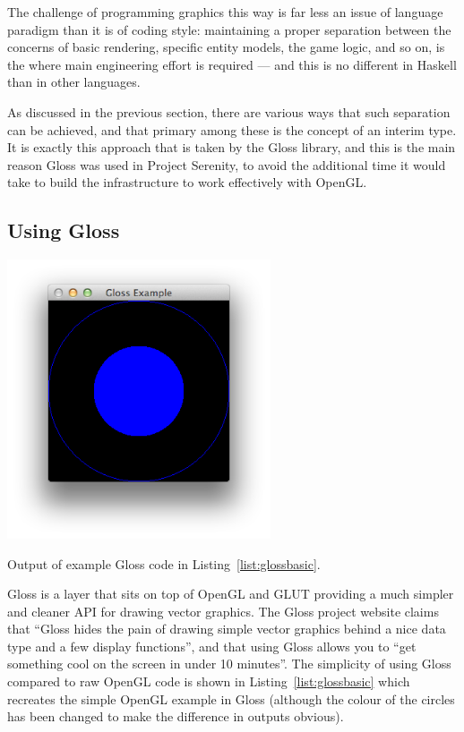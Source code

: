 \vspace{-1em}
\noindent 
The challenge of programming graphics this way is far less an issue of language paradigm than it is of coding style: maintaining a proper separation between the concerns of basic rendering, specific entity models, the game logic, and so on, is the where main engineering effort is required --- and this is no different in Haskell than in other languages. 

As discussed in the previous section, there are various ways that such separation can be achieved, and that primary among these is the concept of an interim type. It is exactly this approach that is taken by the Gloss library, and this is the main reason Gloss was used in Project Serenity, to avoid the additional time it would take to build the infrastructure to work effectively with OpenGL.

\subsection{Using Gloss}

\begin{marginfigure}
	\hspace{-3em}\includegraphics[width=21em]{res/gloss/glossbasic.png}
	\caption[Output of example Gloss code in Listing~\ref{list:glossbasic}]{Output of example Gloss code in Listing~\ref{list:glossbasic}.}
	\label{fig:glossbasicout}
\end{marginfigure}

Gloss is a layer that sits on top of OpenGL and GLUT providing a much simpler and cleaner API for drawing vector graphics. The Gloss project website claims that ``Gloss hides the pain of drawing simple vector graphics behind a nice data type and a few display functions'', and that using Gloss allows you to ``get something cool on the screen in under 10 minutes''. The simplicity of using Gloss compared to raw OpenGL code is shown in Listing~\ref{list:glossbasic} which recreates the simple OpenGL example in Gloss (although the colour of the circles has been changed to make the difference in outputs obvious).

